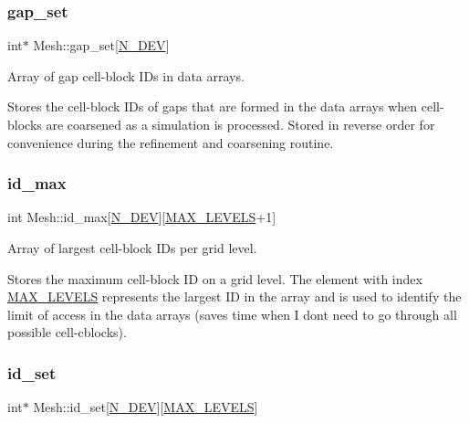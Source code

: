 \mbox{\label{classMesh_ac93e6c7bad14ea20def3e3464a261322}} 
\subsubsection{\texorpdfstring{gap\+\_\+set}{gap\_set}}
{\footnotesize\ttfamily int$\ast$ Mesh\+::gap\+\_\+set\mbox{[}\hyperlink{cppspec_8h_a2b674dab7a14f1bf32b48b7fda5022dc}{N\+\_\+\+D\+EV}\mbox{]}}



Array of gap cell-\/block I\+Ds in data arrays. 

Stores the cell-\/block I\+Ds of gaps that are formed in the data arrays when cell-\/blocks are coarsened as a simulation is processed. Stored in reverse order for convenience during the refinement and coarsening routine. \mbox{\label{classMesh_a6be89a1cad38e58c6904e8125ce26a82}} 
\subsubsection{\texorpdfstring{id\+\_\+max}{id\_max}}
{\footnotesize\ttfamily int Mesh\+::id\+\_\+max\mbox{[}\hyperlink{cppspec_8h_a2b674dab7a14f1bf32b48b7fda5022dc}{N\+\_\+\+D\+EV}\mbox{]}\mbox{[}\hyperlink{cppspec_8h_add784659439a8dd6b1423406171414d3}{M\+A\+X\+\_\+\+L\+E\+V\+E\+LS}+1\mbox{]}}



Array of largest cell-\/block I\+Ds per grid level. 

Stores the maximum cell-\/block ID on a grid level. The element with index \hyperlink{cppspec_8h_add784659439a8dd6b1423406171414d3}{M\+A\+X\+\_\+\+L\+E\+V\+E\+LS} represents the largest ID in the array and is used to identify the limit of access in the data arrays (saves time when I don\textquotesingle{}t need to go through all possible cell-\/cblocks). \mbox{\label{classMesh_a56b8d1c6a79e59537d3ca70fb176fe30}} 
\subsubsection{\texorpdfstring{id\+\_\+set}{id\_set}}
{\footnotesize\ttfamily int$\ast$ Mesh\+::id\+\_\+set\mbox{[}\hyperlink{cppspec_8h_a2b674dab7a14f1bf32b48b7fda5022dc}{N\+\_\+\+D\+EV}\mbox{]}\mbox{[}\hyperlink{cppspec_8h_add784659439a8dd6b1423406171414d3}{M\+A\+X\+\_\+\+L\+E\+V\+E\+LS}\mbox{]}}



